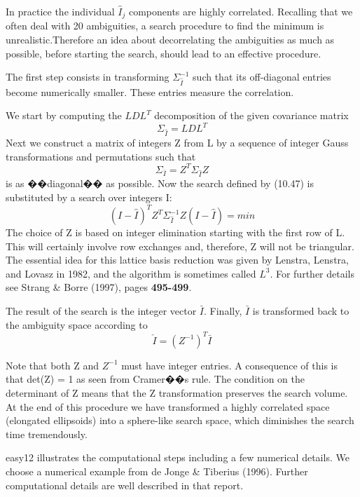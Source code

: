 In practice the individual $\hat{I}_{j}$ components are highly correlated. Recalling that we often deal with 20 ambiguities, a search procedure to find the minimum is unrealistic.Therefore an idea about decorrelating the ambiguities as much as possible, before starting the search, should lead to an effective procedure.

The first step consists in transforming $\Sigma_{\hat{I}}^{-1}$ such that its off-diagonal entries become numerically smaller. These entries measure the correlation.

We start by computing the $LDL^{T}$ decomposition of the given covariance matrix
$$
\Sigma_{\hat{I}}=LDL^{T}
$$
Next we construct a matrix of integers Z from L by a sequence of integer Gauss transformations and permutations such that
$$
\Sigma_{\bar{I}}=Z^{T}\Sigma_{\hat{I}}Z
$$
is as ��diagonal�� as possible. Now the search defined by (10.47) is substituted by a search over integers I:
\begin{equation}
(I-\hat{I})^{T}Z^{T}\Sigma_{\hat{I}}^{-1}Z(I-\hat{I})=min
\end{equation}
The choice of Z is based on integer elimination starting with the first row of L. This will
certainly involve row exchanges and, therefore, Z will not be triangular. The essential idea for this lattice basis reduction was given by Lenstra, Lenstra, and Lovasz in 1982, and the algorithm is sometimes called $L^{3}$. For further details see Strang \& Borre (1997), pages \textbf{495-499}.

The result of the search is the integer vector $\bar{I}$. Finally, $\bar{I}$ is transformed back to the ambiguity space according to
\begin{equation}
\check{I}=(Z^{-1})^{T}\bar{I}
\end{equation}

Note that both Z and $Z^{-1}$ must have integer entries. A consequence of this is that det(Z) = 1 as seen from Cramer��s rule. The condition on the determinant of Z means that the Z transformation preserves the search volume. At the end of this procedure we have transformed a highly correlated space (elongated ellipsoids) into a sphere-like search space, which diminishes the search time tremendously.

easy12 illustrates the computational steps including a few numerical details. We
choose a numerical example from de Jonge \& Tiberius (1996). Further computational
details are well described in that report.

